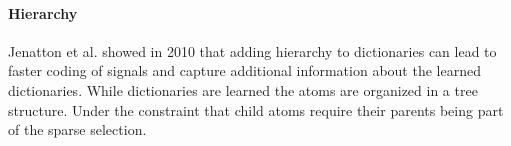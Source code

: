 \paragraph{Hierarchy} Jenatton et al. showed in 2010\cite{Jenatton2010} that
adding hierarchy to dictionaries can lead to faster coding of signals and
capture additional information about the learned dictionaries. While
dictionaries are learned the atoms are organized in a tree structure.
Under the constraint that child atoms require their parents being part of
the sparse selection. 










